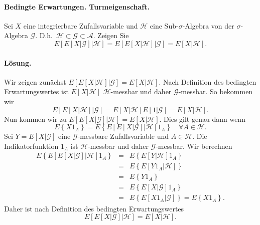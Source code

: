 \paragraph{Bedingte Erwartungen. Turmeigenschaft. } Sei $X$ eine integrierbare Zufallsvariable und
$\mathcal H$ eine Sub-$\sigma$-Algebra von 
der $\sigma$-Algebra $\mathcal G$. D.h.\ $\mathcal H \subset \mathcal G \subset \mathcal A$.
Zeigen Sie
\begin{equation}
	E\left[ E\left[ X | \mathcal G \right] | \mathcal H \right] =
	E\left[ E\left[ X | \mathcal H \right] | \mathcal G \right] =
	E \left[ X | \mathcal H \right].
\end{equation}

\paragraph*{Lösung.} Wir zeigen zunächst 
$E\left[ E\left[ X | \mathcal H \right] | \mathcal G \right]=E \left[ X | \mathcal H \right]$.
Nach Definition des bedingten Erwartungswertes ist $E\left[ X| \mathcal H \right]$ 
$\mathcal H$-messbar und daher $\mathcal G$-messbar. So bekommen wir 
\begin{equation}
	E\left[ E\left[ X | \mathcal H \right] | \mathcal G \right] =
	E\left[ X| \mathcal H \right] E\left[ 1|\mathcal G \right] = 
	E \left[ X | \mathcal H \right ].
\end{equation}
Nun kommen wir zu 
$E\left[ E\left[ X | \mathcal G \right] | \mathcal H \right]=E \left[ X | \mathcal H \right]$.
Dies gilt genau dann wenn 
\begin{equation}
	E\left\{ X 1_A \right\} 
	= E\left\{ E\left[ E\left[ X|\mathcal G \right]|\mathcal H \right] 1_A \right\}  
	\quad \forall A\in\mathcal H.
\end{equation}
Sei $Y=E\left[ X|\mathcal G \right]$ eine $\mathcal G$-messbare Zufallsvariable und
$A\in\mathcal H$. Die Indikatorfunktion $1_A$ ist $\mathcal H$-messbar und daher
$\mathcal G$-messbar. Wir berechnen
\begin{eqnarray}
	E\left\{ E\left[ E\left[ X|\mathcal G \right]|\mathcal H \right] 1_A \right\} &=& 
	E\left\{ E\left[ Y|\mathcal H \right] 1_A \right\} \\
	&=& E\left\{ E\left[ Y 1_A| \mathcal H \right] \right\} \\
	&=& E\left\{ Y 1_A \right\} \\
	&=& E\left\{ E\left[ X|\mathcal G \right] 1_A \right\} \\
	&=& E\left\{ E\left[ X 1_A| \mathcal G \right] \right\} = E\left\{ X 1_A \right\}. 
\end{eqnarray}
Daher ist nach Definition des bedingten Erwartungswertes
\begin{equation}
	E\left[ E\left[ X | \mathcal G \right] | \mathcal H \right]=E \left[ X | \mathcal H \right].
\end{equation}





